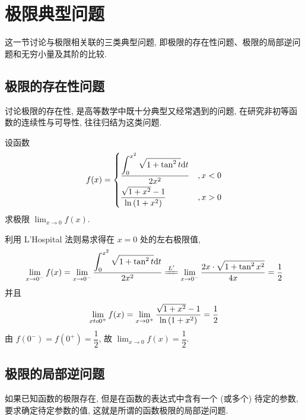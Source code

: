 \section{极限典型问题}

这一节讨论与极限相关联的三类典型问题, 即极限的存在性问题、极限的局部逆问题和无穷小量及其阶的比较.

\subsection{极限的存在性问题}

讨论极限的存在性, 是高等数学中既十分典型又经常遇到的问题, 在研究非初等函数的连续性与可导性, 
往往归结为这类问题.

\begin{example}
    设函数 $$f(x)=\begin{cases}
        \dfrac{\displaystyle \int_{0}^{x^2}\sqrt{1+\tan^2t}\dd t}{2x^2}&,x<0\\[6pt]
        \dfrac{\sqrt{1+x^2}-1}{\ln\qty(1+x^2)}&,x>0
    \end{cases}$$
    求极限 $\displaystyle\lim_{x\to0}f(x).$
\end{example}
\begin{solution}
    利用 L'Hospital 法则易求得在 $x=0$ 处的左右极限值, 
    $$\lim_{x\to0^-}f(x)=\lim_{x\to0^-}\dfrac{\displaystyle\int_{0}^{x^2}\sqrt{1+\tan^2t}\dd t}{2x^2} \xlongequal{L'}\lim_{x\to0^-}\dfrac{2x\cdot\sqrt{1+\tan^2x^2}}{4x}=\dfrac{1}{2}$$
    并且 $$\lim_{xto0^+}f(x)=\lim_{x\to0^+}\dfrac{\sqrt{1+x^2}-1}{\ln\qty(1+x^2)}=\dfrac{1}{2}$$
    由 $f(0^-)=f(0^+)=\dfrac{1}{2}$, 故 $\displaystyle \lim_{x\to0}f(x)=\dfrac{1}{2}.$
\end{solution}

\subsection{极限的局部逆问题}

如果已知函数的极限存在, 但是在函数的表达式中含有一个 (或多个) 待定的参数, 要求确定待定参数的值, 
这就是所谓的函数极限的局部逆问题.


